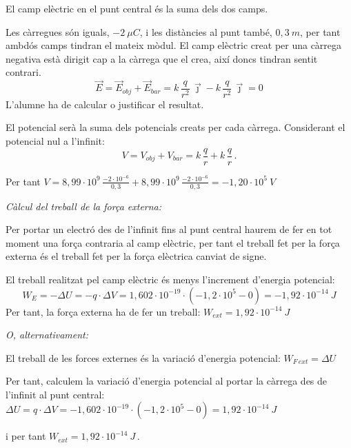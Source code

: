 \begin{solapartat}
 El camp elèctric en el punt central és la suma dels dos camps.

 Les càrregues són iguals, $-2\ \mu C$, i les distàncies al punt també, $0,3\ m$, per tant ambdós camps tindran el mateix mòdul. El camp elèctric creat per una càrrega negativa està dirigit cap a la càrrega que el crea, així doncs tindran sentit contrari.
\[ \vec{E} = \vec{E}_{obj} + \vec{E}_{bar} = k\,\frac{q}{r^2}\,\vec{\jmath} - k\,\frac{q}{r^2}\,\vec{\jmath} = 0 \]
L'alumne ha de calcular o justificar el resultat.

 El potencial serà la suma dels potencials creats per cada càrrega. Considerant el potencial nul a l'infinit:
\[ V = V_{obj} + V_{bar} = k\,\frac{q}{r} + k\,\frac{q}{r}\,. \]

 Per tant $V = 8,99\cdot 10^{9}\,\frac{-2\cdot 10^{-6}}{0,3} + 8,99\cdot 10^{9}\,\frac{-2\cdot 10^{-6}}{0,3} = -1,20\cdot 10^{5}\ V$

\textit{Càlcul del treball de la força externa:}

 Per portar un electró des de l'infinit fins al punt central haurem de fer en tot moment una força contraria al camp elèctric, per tant el treball fet per la força externa és el treball fet per la força elèctrica canviat de signe.

 El treball realitzat pel camp elèctric és menys l'increment d'energia potencial:
\[ W_E = -\Delta U = -q\cdot\Delta V = 1,602\cdot 10^{-19}\cdot(-1,2\cdot 10^{5} - 0) = -1,92\cdot 10^{-14}\ J \]
Per tant, la força externa ha de fer un treball: $W_{ext} = 1,92\cdot 10^{-14}\ J$

\textit{O, alternativament:}

 El treball de les forces externes és la variació d'energia potencial: $W_{F\,ext} = \Delta U$

 Per tant, calculem la variació d'energia potencial al portar la càrrega des de l'infinit al punt central: $\Delta U = q\cdot\Delta V = -1,602\cdot 10^{-19}\cdot(-1,2\cdot 10^{5} - 0) = 1,92\cdot 10^{-14}\ J$

i per tant $W_{ext} = 1,92\cdot 10^{-14}\ J$\,.
\end{solapartat}
